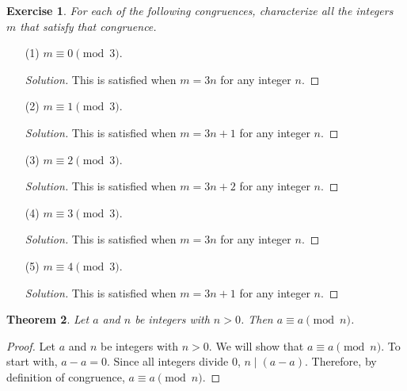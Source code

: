 \documentclass[12pt,leqno]{article}
\numberwithin{equation}{section}
\newtheorem{thm}{Theorem}[section]
\newtheorem{exer}[thm]{Exercise}
\theoremstyle{definition}
\begin{document}
\begin{exer}  For each of the following congruences,
characterize all the integers $m$ that satisfy that congruence.
\end{exer}
\begin{enumerate}
    \item[(1)] $m \equiv 0 \pmod{3}$.
    \begin{proof}[Solution]
    This is satisfied when $m = 3n$ for any integer $n$.
    \end{proof}

	\pagebreak

    \item[(2)] $m \equiv 1 \pmod{3}$.
    \begin{proof}[Solution]
    This is satisfied when $m = 3n + 1$ for any integer $n$.
    \end{proof}

    \item[(3)] $m \equiv 2 \pmod{3}$.
    \begin{proof}[Solution]
    This is satisfied when $m = 3n + 2$ for any integer $n$.
    \end{proof}

    \item[(4)] $m \equiv 3 \pmod{3}$.
    \begin{proof}[Solution]
    This is satisfied when $m = 3n$ for any integer $n$.
    \end{proof}

    \item[(5)] $m \equiv 4 \pmod{3}$.
    \begin{proof}[Solution]
    This is satisfied when $m = 3n + 1$ for any integer $n$.
    \end{proof}

\end{enumerate}

\begin{thm}
Let $a$ and $n$ be integers with $n > 0$. Then $a \equiv a
\pmod{n}$.
\end{thm}

\begin{proof}[Proof]
Let $a$ and $n$ be integers with $n > 0$.  We will show that $a \equiv a
\pmod{n}$.  To start with, $a - a = 0$.  Since all integers divide 0, $n 
\mid (a - a)$.  Therefore, by definition of congruence, $a \equiv a
\pmod{n}$.
\end{proof}
\end{document}
